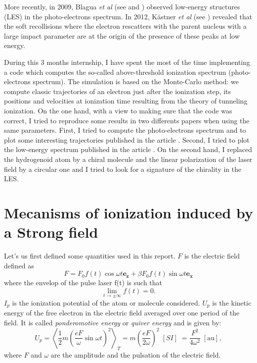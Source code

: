 \documentclass[a4paper]{article}
\begin{document}
\par
More recently, in 2009, Blagua \textit{et al} (see \cite{Blaga_2009} and \cite{Quan_2009}) observed low-energy structures (LES) in the photo-electrons spectrum. In 2012, K\"astner \textit{et al} (see \cite{Kastner_2012_soft}) revealed that the soft recollisions where the electron rescatters with the parent nucleus with a large impact parameter are at the origin of the presence of these peaks at low energy.
\par
During this 3 months internship, I have spent the most of the time implementing a code which computes the so-called above-threshold ionization spectrum (photo-electrons spectrum). The simulation is based on the Monte-Carlo method: we compute classic trajectories of an electron just after the ionization step, its positions and velocities at ionization time resulting from the theory of tunneling ionization. 
On the one hand, with a view to making sure that the code was correct, I tried to reproduce some results in two differents papers when using the same parameters. First, I tried to compute the photo-electrons spectrum and to plot some interesting trajectories published in the article \cite{Hu_1997}. Second, I tried to plot the low-energy spectrum published in the article \cite{Kastner_2012_pulse}.
On the second hand, I replaced the hydrogenoid atom by a chiral molecule and the linear polarization of the laser field by a circular one and I tried to look for a signature of the chirality in the LES.


\section{Mecanisms of ionization induced by a Strong field}
Let's us first defined some quantities used in this report. $F$ is the electric field defined as
\begin{equation}
\label{electric_field}
F=F_{0} f(t)\cos{\omega t} \mathbf{e_{z}} + \beta F_{0} f(t)\sin{\omega t} \mathbf{e_{x}}
\end{equation}
where the envelop of the pulse laser f(t) is such that
\begin{equation}
\label{envelop}
 \lim_{t\to\pm\infty} f(t)=0.
\end{equation}
$I_{p}$ is the ionization potential of the atom or molecule considered. $U_{p}$ is the kinetic energy of the free electron in the electric field averaged over one period of the field. It is called \textit{ponderomotive energy} or \textit{quiver energy} and is given by:
\begin{equation}
U_{p}=\left< \frac{1}{2}m \left(\frac{eF}{\omega}\sin{\omega t} \right)^{2} \right>_{T} = m \left( \frac{eF}{2\omega} \right)^{2} \; [SI] \; = \frac{F^{2}}{4\omega^{2}} \; [\text{au}],
\end{equation}  
where $F$ and $\omega$ are the amplitude and the pulsation of the electric field.
\end{document}
